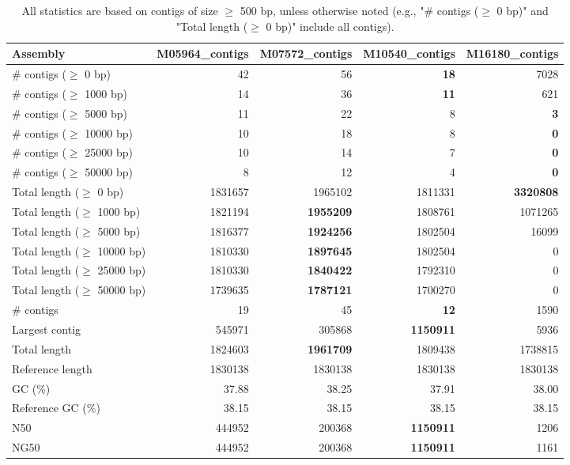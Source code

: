 \documentclass[12pt,a4paper]{article}
\begin{document}
\begin{table}[ht]
\begin{center}
\caption{All statistics are based on contigs of size $\geq$ 500 bp, unless otherwise noted (e.g., "\# contigs ($\geq$ 0 bp)" and "Total length ($\geq$ 0 bp)" include all contigs).}
\begin{tabular}{|l*{4}{|r}|}
\hline
Assembly & M05964\_contigs & M07572\_contigs & M10540\_contigs & M16180\_contigs \\ \hline
\# contigs ($\geq$ 0 bp) & 42 & 56 & {\bf 18} & 7028 \\ \hline
\# contigs ($\geq$ 1000 bp) & 14 & 36 & {\bf 11} & 621 \\ \hline
\# contigs ($\geq$ 5000 bp) & 11 & 22 & 8 & {\bf 3} \\ \hline
\# contigs ($\geq$ 10000 bp) & 10 & 18 & 8 & {\bf 0} \\ \hline
\# contigs ($\geq$ 25000 bp) & 10 & 14 & 7 & {\bf 0} \\ \hline
\# contigs ($\geq$ 50000 bp) & 8 & 12 & 4 & {\bf 0} \\ \hline
Total length ($\geq$ 0 bp) & 1831657 & 1965102 & 1811331 & {\bf 3320808} \\ \hline
Total length ($\geq$ 1000 bp) & 1821194 & {\bf 1955209} & 1808761 & 1071265 \\ \hline
Total length ($\geq$ 5000 bp) & 1816377 & {\bf 1924256} & 1802504 & 16099 \\ \hline
Total length ($\geq$ 10000 bp) & 1810330 & {\bf 1897645} & 1802504 & 0 \\ \hline
Total length ($\geq$ 25000 bp) & 1810330 & {\bf 1840422} & 1792310 & 0 \\ \hline
Total length ($\geq$ 50000 bp) & 1739635 & {\bf 1787121} & 1700270 & 0 \\ \hline
\# contigs & 19 & 45 & {\bf 12} & 1590 \\ \hline
Largest contig & 545971 & 305868 & {\bf 1150911} & 5936 \\ \hline
Total length & 1824603 & {\bf 1961709} & 1809438 & 1738815 \\ \hline
Reference length & 1830138 & 1830138 & 1830138 & 1830138 \\ \hline
GC (\%) & 37.88 & 38.25 & 37.91 & 38.00 \\ \hline
Reference GC (\%) & 38.15 & 38.15 & 38.15 & 38.15 \\ \hline
N50 & 444952 & 200368 & {\bf 1150911} & 1206 \\ \hline
NG50 & 444952 & 200368 & {\bf 1150911} & 1161 \\ \hline

\end{tabular}
\end{center}
\end{table}
\end{document}
